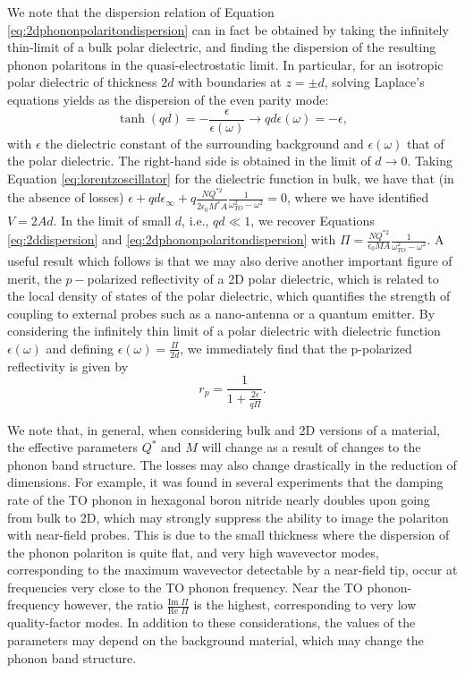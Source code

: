 \documentclass[aps,prb,twocolumn,
	groupedaddress,superscriptaddress,
	amsfonts,amssymb,amsmath,floatfix,
	citeautoscript]{revtex4-1}
\begin{document}
We note that the dispersion relation of Equation \ref{eq:2dphononpolaritondispersion} can in fact be obtained by taking the infinitely thin-limit of a bulk polar dielectric, and finding the dispersion of the resulting phonon polaritons in the quasi-electrostatic limit. In particular, for an isotropic polar dielectric of thickness $2d$ with boundaries at $z=\pm d$, solving Laplace's equations yields as the dispersion of the even parity mode:
\begin{equation}\label{eq:thinfilmphononpolaritondispersion}
\tanh(qd) = -\frac{\epsilon}{\epsilon(\omega)} \rightarrow qd\epsilon(\omega) = -\epsilon,
\end{equation}
with $\epsilon$ the dielectric constant of the surrounding background and $\epsilon(\omega)$ that of the polar dielectric. The right-hand side is obtained in the limit of $d\rightarrow 0$. Taking Equation \ref{eq:lorentzoscillator} for the dielectric function in bulk, we have that (in the absence of losses) $\epsilon + qd\epsilon_{\infty} + q\frac{NQ^{*2}}{2\epsilon_0 M^*A}\frac{1}{\omega_{TO}^2-\omega^2} = 0$, where we have identified $V = 2Ad$. In the limit of small $d$, i.e., $qd \ll 1$, we recover Equations \ref{eq:2ddispersion} and \ref{eq:2dphononpolaritondispersion} with $\Pi = \frac{NQ^{*2}}{\epsilon_0 MA}\frac{1}{\omega^2_{TO}-\omega^2}$. A useful result which follows is that we may also derive another important figure of merit, the $p-$polarized reflectivity of a 2D polar dielectric, which is related to the local density of states of the polar dielectric, which quantifies the strength of coupling to external probes such as a nano-antenna or a quantum emitter. By considering the infinitely thin limit of a polar dielectric with dielectric function $\epsilon(\omega)$ and defining $\epsilon(\omega) = \frac{\Pi}{2d}$, we immediately find that the p-polarized reflectivity is given by
\begin{equation}\label{eq:2dtmreflectivity}
r_p = \frac{1}{1+\frac{2\epsilon}{q\Pi}}.
\end{equation}

We note that, in general, when considering bulk and 2D versions of a material, the effective parameters $Q^*$ and $M$ will change as a result of changes to the phonon band structure. The losses may also change drastically in the reduction of dimensions. For example, it was found in several experiments that the damping rate of the TO phonon in hexagonal boron nitride nearly doubles upon going from bulk to 2D\cite{gorbachev2011hunting,tran2016quantum}, which may strongly suppress the ability to image the polariton with near-field probes. This is due to the small thickness where the dispersion of the phonon polariton is quite flat, and very high wavevector modes, corresponding to the maximum wavevector detectable by a near-field tip, occur at frequencies very close to the TO phonon frequency. Near the TO phonon-frequency however, the ratio $\frac{\text{Im }\Pi}{\text{Re }\Pi}$ is the highest, corresponding to very low quality-factor modes. In addition to these considerations, the values of the parameters may depend on the background material, which may change the phonon band structure. 
\end{document}
